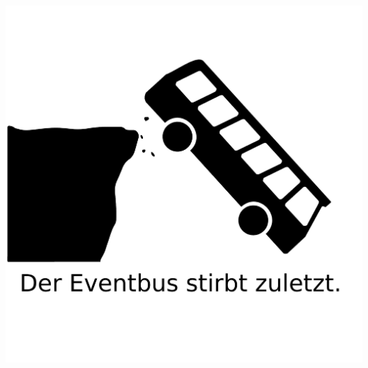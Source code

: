 \documentclass[10pt]{beamer}
\begin{document}
{\1
\begin{frame}
  \includegraphics[width = \textwidth]{img/eventbus}
\end{frame}}
\end{document}

